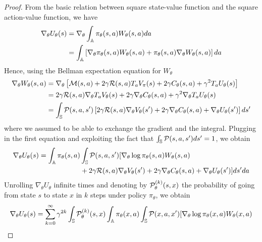 \begin{proof}
	From the basic relation between square state-value function and the square action-value function, we have
	\begin{equation*}
		\begin{split}
			\nabla_\theta U_\theta(s) &= \nabla_\theta \int_{\mathbb{A}} \pi_\theta(s,a) W_\theta(s,a) da\\
				&= \int_{\mathbb{A}} \left[ \nabla_\theta \pi_\theta(s,a) W_\theta(s,a) + \pi_\theta(s,a) \nabla_\theta W_\theta(s,a)\right] da
		\end{split}
	\end{equation*} 
	Hence, using the Bellman expectation equation for $W_\theta$ 
	\begin{equation*}
		\begin{split}
			\nabla_\theta W_\theta(s,a) &= \nabla_\theta \left[ \mathcal{M}(s,a) + 2 \gamma \mathcal{R}(s,a) T_a V_\pi(s) + 2 \gamma C_\theta(s, a) + \gamma^2 T_a U_\theta(s)\right]\\ 
			&= 2 \gamma \mathcal{R}(s,a) \nabla_\theta T_a V_\theta(s) + 2 \gamma \nabla_\theta C_\theta(s, a) + \gamma^2 \nabla_\theta T_a U_\theta(s)\\
			&= \int_{\mathbb{S}} \mathcal{P}(s,a,s') \left[2 \gamma \mathcal{R}(s,a) \nabla_\theta V_\theta(s') + 2 \gamma \nabla_\theta C_\theta(s, a) + \nabla_\theta U_\theta(s')\right] ds'
		\end{split}
	\end{equation*}
	where we assumed to be able to exchange the gradient and the integral. Plugging in the first equation and exploiting the fact that $\int_{\mathbb{S}} \mathcal{P}(s,a,s') ds' = 1$, we obtain
	\begin{equation*}
		\begin{split}
			\nabla_\theta U_\theta(s) = \int_{\mathbb{A}} \pi_\theta(s,a) &\int_{\mathbb{S}} \mathcal{P}(s,a,s') [ \nabla_\theta \log \pi_\theta(s,a) W_\theta(s,a)\\ 
			&+ 2 \gamma \mathcal{R}(s,a) \nabla_\theta V_\theta(s') + 2 \gamma \nabla_\theta C_\theta(s, a) + \nabla_\theta U_\theta(s') ] ds' da
		\end{split}
	\end{equation*} 
	Unrolling $\nabla_\theta U_\theta$ infinite times and denoting by $\mathcal{P}_\theta^{(k)}(s, x)$ the probability of going from state $s$ to state $x$ in $k$ steps under policy $\pi_\theta$, we obtain
	\begin{equation*}
		\begin{split}
			\nabla_\theta U_\theta(s) = \sum_{k=0}^\infty \gamma^{2k} \int_\S \calP_\theta^{(k)}(s, x) &\int_\A \pi_\theta(x,a) \int_{\S} \calP(x,a,x') [\nabla_\theta \log \pi_\theta(x,a) W_\theta(x,a)\\ 

\end{split}
\end{equation*}
\end{proof}

